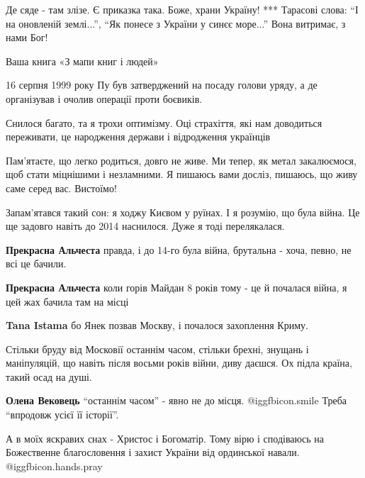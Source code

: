 \begin{itemize}
Де сяде - там злізе. Є приказка така.
Боже, храни Україну!
***
Тарасові слова: \enquote{І на оновленій землі...}, \enquote{Як понесе з України
у синєє море...} Вона витримає, з нами Бог!


Ваша книга «З мапи книг і людей»

16 серпня 1999 року Пу був затверджений на посаду голови уряду, а де
організував і очолив операції проти боєвиків.


Снилося багато, та я трохи оптимізму. Оці страхіття, які нам доводиться
переживати, це народження держави і відродження українців

Пам'ятаєте, що легко родиться, довго не живе. Ми тепер, як метал закалюємося,
щоб стати міцнішими і незламними. Я пишаюсь вами досліз, пишаюсь, що живу саме
серед вас. Вистоїмо!


Запам'ятався такий сон: я ходжу Києвом у руїнах. І я розумію, що була війна. Це
ще задовго навіть до 2014 наснилося. Дуже я тоді перелякалася.

\begin{itemize} %
\textbf{Прекрасна Альчеста} правда, і до 14-го була війна, брутальна - хоча, певно, не всі це бачили.

\textbf{Прекрасна Альчеста} коли горів Майдан 8 років тому - це й почалася війна, я цей жах бачила там на місці

\textbf{Tana Istama} бо Янек позвав Москву, і почалося захоплення Криму.
\end{itemize} %


Стільки бруду від Московії останнім часом, стільки брехні, знущань і
маніпуляцій, що навіть після восьми років війни, диву даєшся. Ох підла країна,
такий осад на душі.

\begin{itemize} %
\textbf{Олена Вековець} \enquote{останнім часом} - явно не до місця.
@igg{fbicon.smile}  Треба \enquote{впродовж усієї її історії}.
\end{itemize} %


А в моїх яскравих снах - Христос і Богоматір. Тому вірю і сподіваюсь на
Божественне благословення і захист України від ординської навали.  @igg{fbicon.hands.pray} 


\end{itemize}

